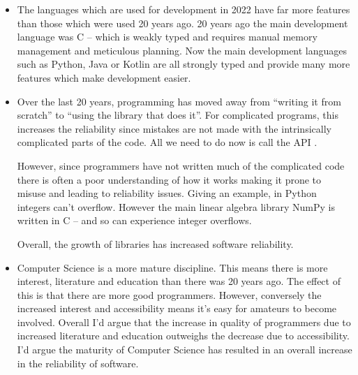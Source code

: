 \documentclass[10pt,\jkfside,a4paper]{article}
\begin{document}
\begin{enumerate}
\begin{itemize}
\item The languages which are used for development in 2022 have far more
features than those which were used 20 years ago. 20 years ago the main
development language was C -- which is weakly typed and requires manual
memory management and meticulous planning. Now the main development languages
such as Python, Java or Kotlin are all strongly typed and provide many more
features which make development easier.

\item Over the last 20 years, programming has moved away from ``writing it
from scratch'' to ``using the library that does it''. For complicated programs,
this increases the reliability since mistakes are not made with the
intrinsically complicated parts of the code. All we need to do now is
call the API .

However, since programmers have not written much of the complicated code there
is often a poor understanding of how it works making it prone to misuse and
leading to reliability issues. Giving an example, in Python integers can't
overflow. However the main linear algebra library NumPy is written in C -- and
so can experience integer overflows.

Overall, the growth of libraries has increased software reliability.

\item Computer Science is a more mature discipline. This means there is more
interest, literature and education than there was 20 years ago. The effect
of this is that there are more good programmers. However, conversely the
increased interest and accessibility means it's easy for amateurs to
become involved. Overall I'd argue that the increase in quality of
programmers due to increased literature and education outweighs the
decrease due to accessibility. I'd argue the maturity of Computer
Science has resulted in an overall increase in the reliability of software.

\end{itemize}

\end{enumerate}
\end{document}
